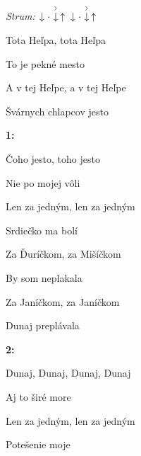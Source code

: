 \begin{song}


\begin{headerbox}
\RaiseBoxWithAccents
{} \quad
\textit{Strum:} $\Down\Miss\AccentDown\Up\ \Down\Miss\AccentDown\Up$
\end{headerbox}

\begin{hchordbox}
\end{hchordbox}


\Large

\bigskip

 \par
{}Tota Heľpa, tota Heľpa \par
{}To je pekné mesto \par
{}A v tej Heľpe, a v tej Heľpe \par
{}Švárnych chlapcov jesto\par

\bigskip

\Refren\textbf{ 1:}  \par
{}Čoho jesto, toho jesto \par
{}Nie po mojej vôli \par
{}Len za jedným, len za jedným \par
{}Srdiečko ma bolí \par

\bigskip

 \par
{}Za Ďuríčkom, za Mišíčkom \par
{}By som neplakala \par
{}Za Janíčkom, za Janíčkom \par
{}Dunaj preplávala \par

\bigskip

\Refren\textbf{ 2:}  \par
{}Dunaj, Dunaj, Dunaj, Dunaj \par
{}Aj to širé more \par
{}Len za jedným, len za jedným \par
{}Potešenie moje \par

\end{song}